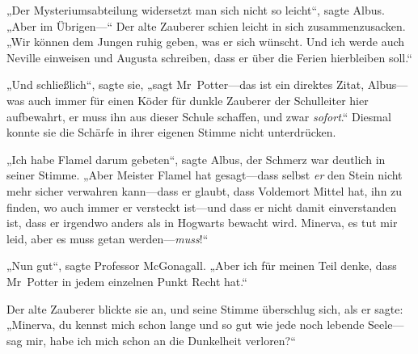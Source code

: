„Der Mysteriumsabteilung widersetzt man sich nicht so leicht“, sagte Albus. „Aber im Übrigen—“ Der alte Zauberer schien leicht in sich zusammenzusacken. „Wir können dem Jungen ruhig geben, was er sich wünscht. Und ich werde auch Neville einweisen und Augusta schreiben, dass er über die Ferien hierbleiben soll.“

„Und schließlich“, sagte sie, „sagt Mr~Potter—das ist ein direktes Zitat, Albus—was auch immer für einen Köder für dunkle Zauberer der Schulleiter hier aufbewahrt, er muss ihn aus dieser Schule schaffen, und zwar \emph{sofort}.“
Diesmal konnte sie die Schärfe in ihrer eigenen Stimme nicht unterdrücken.

„Ich habe Flamel darum gebeten“, sagte Albus, der Schmerz war deutlich in seiner Stimme. „Aber Meister Flamel hat gesagt—dass selbst \emph{er} den Stein nicht mehr sicher verwahren kann—dass er glaubt, dass Voldemort Mittel hat, ihn zu finden, wo auch immer er versteckt ist—und dass er nicht damit einverstanden ist, dass er irgendwo anders als in Hogwarts bewacht wird. Minerva, es tut mir leid, aber es muss getan werden—\emph{muss}!“

„Nun gut“, sagte Professor McGonagall. „Aber ich für meinen Teil denke, dass Mr~Potter in jedem einzelnen Punkt Recht hat.“

Der alte Zauberer blickte sie an, und seine Stimme überschlug sich, als er sagte: „Minerva, du kennst mich schon lange und so gut wie jede noch lebende Seele—sag mir, habe ich mich schon an die Dunkelheit verloren?“

